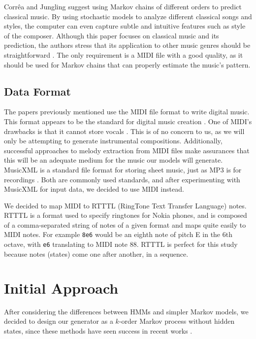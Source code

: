 \documentclass{article}
\begin{document}
Corrêa and Jungling suggest using Markov chains of different orders to predict classical music. By using stochastic models to analyze different classical songs and styles,
the computer can even capture subtle and intuitive features such as style of the composer. Although this paper focuses on classical music and its prediction, the authors 
stress that its application to other music genres should be straightforward \cite{correa_jungling_small_2020}. 
The only requirement is a MIDI file with a good quality, as it should be used for Markov chains that can properly estimate the music's pattern.

\subsection{Data Format}
The papers previously mentioned use the MIDI file format to write digital music. This format appears to be the standard for digital music creation \cite{midi_format}. 
One of MIDI's drawbacks is that it cannot store vocals \cite{cataltepe_2007}. This is of no concern to us, as we will only be attempting to generate instrumental 
compositions. Additionally, successful approaches to melody extraction from MIDI files \cite{ozcan_2005} make assurances that this will be an adequate medium for the 
music our models will generate. MusicXML is a standard file format for storing sheet music, just as MP3 is for recordings \cite{musicxml_2022}. Both are commonly used 
standards, and after experimenting with MusicXML for input data, we decided to use MIDI instead.

We decided to map MIDI to RTTTL (RingTone Text Transfer Language) notes. RTTTL is a format used to specify ringtones for Nokia phones, and is composed of a comma-separated 
string of notes of a given format \cite{rtttl_spec} and maps quite easily to MIDI notes. For example \texttt{8e6} would be an eighth note of pitch E in the 6th octave, 
with \texttt{e6} translating to MIDI note 88. RTTTL is perfect for this study because notes (states) come one after another, in a sequence.

\section{Initial Approach}
After considering the differences between HMMs and simpler Markov models, we decided to design our generator as a $k$-order Markov process without hidden states, 
since these methods have seen success in recent works \cite{shapiro_huber_2021,correa_jungling_small_2020}. 
\end{document}

